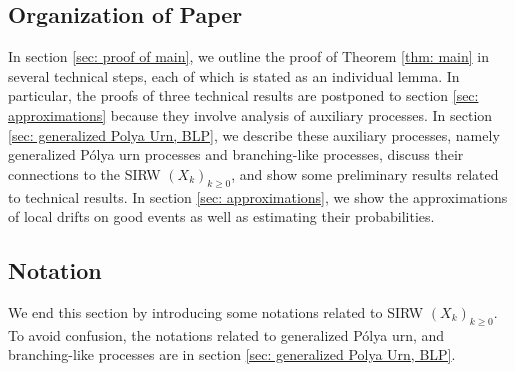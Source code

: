 \documentclass[twoside,12pt,a4paper]{article}
\numberwithin{equation}{section}
\begin{document}
	\subsection{Organization of Paper}
	In section \ref{sec: proof of main}, we outline the proof of Theorem \ref{thm: main} in several technical steps, each of which is stated as an individual lemma. In particular, the proofs of three technical results are postponed to section \ref{sec: approximations} because they involve analysis of auxiliary processes. In section \ref{sec: generalized Polya Urn, BLP}, we describe these auxiliary processes, namely generalized P\'{o}lya urn processes and branching-like processes, discuss their connections to the SIRW $(X_k)_{k\geq 0}$, and show some preliminary results related to technical results. In section \ref{sec: approximations}, we show the approximations of local drifts on good events as well as estimating their probabilities. 
	
	\subsection{Notation}
	
	We end this section by introducing some notations related to SIRW $(X_k)_{k\geq 0}$. To avoid confusion, the notations related to generalized P\'{o}lya urn, and branching-like processes are in section \ref{sec: generalized Polya Urn, BLP}.
	
\end{document}
